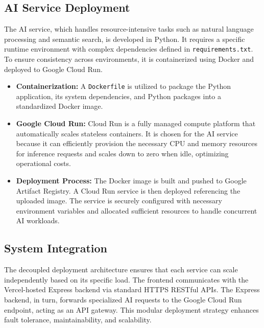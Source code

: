 \subsection{AI Service Deployment}
The AI service, which handles resource-intensive tasks such as natural language processing and semantic search, is developed in Python. It requires a specific runtime environment with complex dependencies defined in \texttt{requirements.txt}. To ensure consistency across environments, it is containerized using Docker and deployed to Google Cloud Run.

\begin{itemize}
    \item \textbf{Containerization:} A \texttt{Dockerfile} is utilized to package the Python application, its system dependencies, and Python packages into a standardized Docker image.
    \item \textbf{Google Cloud Run:} Cloud Run is a fully managed compute platform that automatically scales stateless containers. It is chosen for the AI service because it can efficiently provision the necessary CPU and memory resources for inference requests and scales down to zero when idle, optimizing operational costs.
    \item \textbf{Deployment Process:} The Docker image is built and pushed to Google Artifact Registry. A Cloud Run service is then deployed referencing the uploaded image. The service is securely configured with necessary environment variables and allocated sufficient resources to handle concurrent AI workloads.
\end{itemize}

\subsection{System Integration}
The decoupled deployment architecture ensures that each service can scale independently based on its specific load. The frontend communicates with the Vercel-hosted Express backend via standard HTTPS RESTful APIs. The Express backend, in turn, forwards specialized AI requests to the Google Cloud Run endpoint, acting as an API gateway. This modular deployment strategy enhances fault tolerance, maintainability, and scalability.